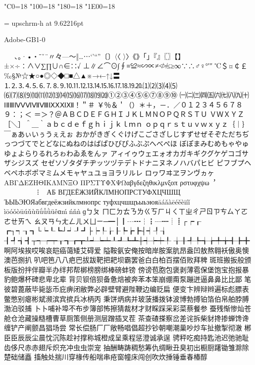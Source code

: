 %
%
%
%
\kcatcode"C0=18%
\kcatcode"100=18%
\kcatcode"180=18%
\kcatcode"1E00=18%

\font\upschrm = upschrm-h at 9.62216pt
\upschrm


Adobe-GB1-0

 　、。·•・ˉˇ¨〃々—～‖…⋯‘’“”〔〕〈〈
〉〉《》「」『』〖〗【】±×÷∶∧∨∑∏∪∩∈∷√
⊥∥∠⌒⊙∫∮≡≌≈∽∝≠≮≯≤≥∞∵∴♂♀°′″
℃＄¤￠￡‰§№☆★○●◎◇◆□■△▲※→←↑↓〓
⒈⒉⒊⒋⒌⒍⒎⒏⒐⒑⒒⒓⒔⒕⒖⒗⒘⒙⒚⒛⑴⑵⑶⑷⑸
⑹⑺⑻⑼⑽⑾⑿⒀⒁⒂⒃⒄⒅⒆⒇①②③④⑤⑥⑦⑧⑨⑩
㈠㈡㈢㈣㈤㈥㈦㈧㈨㈩ⅠⅡⅢⅣⅤⅥⅦⅧⅨⅩⅪⅫ！＂＃
￥％＆＇（）＊＋，－．／０１２３４５６７８９：；＜
＝＞？＠ＡＢＣＤＥＦＧＨＩＪＫＬＭＮＯＰＱＲＳＴＵ
ＶＷＸＹＺ［＼］＾＿｀ａｂｃｄｅｆｇｈｉｊｋｌｍｎ
ｏｐｑｒｓｔｕｖｗｘｙｚ｛｜｝￣ぁあぃいぅうぇえぉ
おかがきぎくぐけげこごさざしじすずせぜそぞただちぢ
っつづてでとどなにぬねのはばぱひびぴふぶぷへべぺほ
ぼぽまみむめもゃやゅゆょよらりるれろゎわゐゑをんァ
アィイゥウェエォオカガキギクグケゲコゴサザシジスズ
セゼソゾタダチヂッツヅテデトドナニヌネノハバパヒビ
ピフブプヘベペホボポマミムメモャヤュユョヨラリルレ
ロヮワヰヱヲンヴヵヶΑΒΓΔΕΖΗΘΙΚΛΜΝΞΟ
ΠΡΣΤΥΦΧΨΩαβγδεζηθικλμνξοπ
ρστυφχψω︐︒︑︓︔︕︖︵︶︹
︺︿﹀︽︾﹁﹂﹃﹄︗︘︻︼︷︸︱⁝︙︳︴АБ
ВГДЕЁЖЗИЙКЛМНОПРСТУФХЦЧШЩ
ЪЫЬЭЮЯабвгдеёжзийклмнопрс
туфхцчшщъыьэюяāáǎàēéěèīíǐ
ìōóǒòūúǔùǖǘǚǜüêɑḿńňǹɡㄅㄆ
ㄇㄈㄉㄊㄋㄌㄍㄎㄏㄐㄑㄒㄓㄔㄕㄖㄗㄘㄙㄚㄛㄜㄝㄞㄟ
ㄠㄡㄢㄣㄤㄥㄦㄨㄩㄧ─━│┃┄┅┆┇┈┉┊┋┌┍┎
┏┐┑┒┓└┕┖┗┘┙┚┛├┝┞┟┠┡┢┣┤┥┦┧
┨┩┪┫┬┭┮┯┰┱┲┳┴┵┶┷┸┹┺┻┼┽┾┿╀
╁╂╃╄╅╆╇╈╉╊╋啊阿埃挨哎唉哀皑癌蔼矮艾碍爱
隘鞍氨安俺按暗岸胺案肮昂盎凹敖熬翱袄傲奥懊澳芭捌扒
叭吧笆⼋八疤巴拔跋靶把耙坝霸罢爸⽩白柏百摆佰败拜稗
斑班搬扳般颁板版扮拌伴瓣半办绊邦帮梆榜膀绑棒磅蚌镑
傍谤苞胞包褒剥薄雹保堡饱宝抱报暴豹鲍爆杯碑悲卑北辈
背贝钡倍狈备惫焙被奔苯本笨崩绷甭泵蹦迸逼⿐鼻⽐比鄙
笔彼碧蓖蔽毕毙毖币庇痹闭敝弊必辟壁臂避陛鞭边编贬扁
便变卞辨辩辫遍标彪膘表鳖憋别瘪彬斌濒滨宾摈兵冰柄丙
秉饼炳病并玻菠播拨钵波博勃搏铂箔伯帛舶脖膊渤泊驳捕
⼘卜哺补埠不布步簿部怖擦猜裁材才财睬踩采彩菜蔡餐参
蚕残惭惨灿苍舱仓沧藏操糙槽曹草厕策侧册测层蹭插叉茬
茶查碴搽察岔差诧拆柴豺搀掺蝉馋谗缠铲产阐颤昌猖场尝
常长偿肠⼚厂敞畅唱倡超抄钞朝嘲潮巢吵炒车扯撤掣彻澈
郴⾂臣⾠辰尘晨忱沉陈趁衬撑称城橙成呈乘程惩澄诚承逞
骋秤吃痴持匙池迟弛驰耻齿侈尺⾚赤翅斥炽充冲⾍虫崇宠
抽酬畴踌稠愁筹仇绸瞅丑臭初出橱厨躇锄雏滁除楚础储矗
搐触处揣川穿椽传船喘串疮窗幢床闯创吹炊捶锤垂春椿醇
